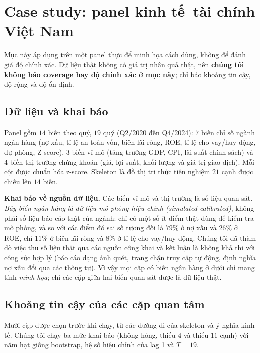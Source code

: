 \section{Case study: panel kinh tế--tài chính Việt Nam}\label{sec:case-study}

Mục này áp dụng \ours{} trên một panel thực để minh họa cách dùng, không để đánh giá độ chính xác. Dữ liệu thật không có giá trị nhân quả thật, nên \textbf{chúng tôi không báo coverage hay độ chính xác ở mục này}; chỉ báo khoảng tin cậy, độ rộng và độ ổn định.

\subsection{Dữ liệu và khai báo}
Panel gồm $14$ biến theo quý, $19$ quý (Q2/2020 đến Q4/2024): $7$ biến chỉ số ngành ngân hàng (nợ xấu, tỉ lệ an toàn vốn, biên lãi ròng, ROE, tỉ lệ cho vay/huy động, dự phòng, Z-score), $3$ biến vĩ mô (tăng trưởng GDP, CPI, lãi suất chính sách) và $4$ biến thị trường chứng khoán (giá, lợi suất, khối lượng và giá trị giao dịch). Mỗi cột được chuẩn hóa z-score. Skeleton là đồ thị tri thức tiên nghiệm $21$ cạnh được chiếu lên $14$ biến.

\textbf{Khai báo về nguồn dữ liệu.} Các biến vĩ mô và thị trường là số liệu quan sát. \emph{Bảy biến ngân hàng là dữ liệu mô phỏng hiệu chỉnh (simulated-calibrated)}, không phải số liệu báo cáo thật của ngành: chỉ có một số ít điểm thật dùng để kiểm tra mô phỏng, và so với các điểm đó sai số tương đối là $79\%$ ở nợ xấu và $26\%$ ở ROE, chỉ $11\%$ ở biên lãi ròng và $8\%$ ở tỉ lệ cho vay/huy động. Chúng tôi đã thăm dò việc thu số liệu thật qua các nguồn công khai và kết luận là không khả thi với công sức hợp lý (báo cáo dạng ảnh quét, trang chặn truy cập tự động, định nghĩa nợ xấu đổi qua các thông tư). Vì vậy mọi cặp có biến ngân hàng ở dưới chỉ mang tính \emph{minh họa}; chỉ các cặp giữa hai biến quan sát được là dữ liệu thật.

\subsection{Khoảng tin cậy của các cặp quan tâm}
Mười cặp được chọn trước khi chạy, từ các đường đi của skeleton và ý nghĩa kinh tế. Chúng tôi chạy ba mức khai báo (không hỏng, thiếu $4$ và thiếu $11$ cạnh) với năm hạt giống bootstrap, hệ số hiệu chỉnh của lag 1 và $T=19$.

\begin{table}[H]
\centering\footnotesize
\setlength{\tabcolsep}{2.5pt}

\caption{Hiệu ứng tích lũy $C(H{=}4)$ (trung vị trên năm hạt giống) và khoảng tin cậy. Đơn vị: độ lệch chuẩn của biến kết quả cho một độ lệch chuẩn của nguyên nhân.}\label{tab:realpanel}
\end{table}

